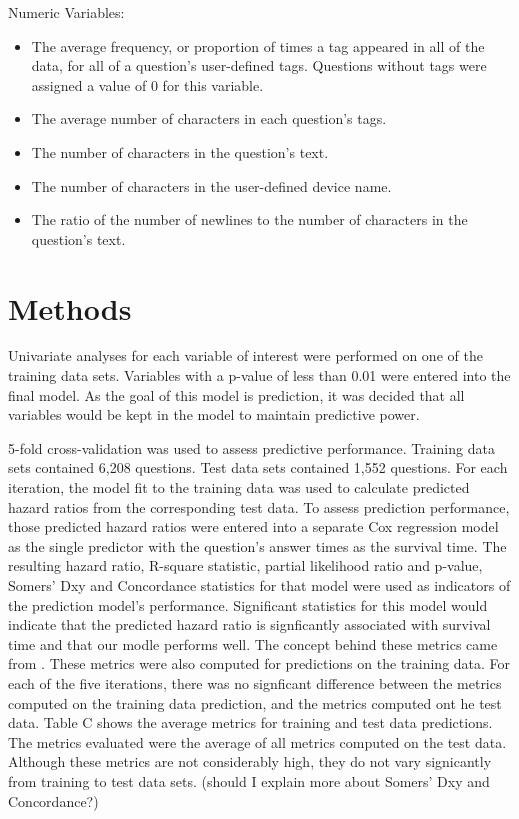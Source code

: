 \documentclass[12pt]{article}
\begin{document}
Numeric Variables:

\begin{itemize}
  \item The average frequency, or proportion of times a tag appeared in all of the data, for all of a question's user-defined tags. Questions without tags were assigned a value of 0 for this variable. 
  \item The average number of characters in each question's tags. 
  \item The number of characters in the question's text. 
  \item The number of characters in the user-defined device name. 
  \item The ratio of the number of newlines to the number of characters in the question's text.
\end{itemize}

\section{Methods} 

Univariate analyses for each variable of interest were performed on one of the training data sets. Variables with a p-value of less than 0.01 were entered into the final model. As the goal of this model is prediction, it was decided that all variables would be kept in the model to maintain predictive power. 

5-fold cross-validation was used to assess predictive performance. Training data sets contained 6,208 questions. Test data sets contained 1,552 questions. For each iteration, the model fit to the training data was used to calculate predicted hazard ratios from the corresponding test data. To assess prediction performance, those predicted hazard ratios were entered into a separate Cox regression model as the single predictor with the question's answer times as the survival time. The resulting hazard ratio, R-square statistic, partial likelihood ratio and p-value, Somers' Dxy and Concordance statistics for that model were used as indicators of the prediction model's performance. Significant statistics for this model would indicate that the predicted hazard ratio is signficantly associated with survival time and that our modle performs well. The concept behind these metrics came from \cite{Chen}. These metrics were also computed for predictions on the training data. For each of the five iterations, there was no signficant difference between the metrics computed on the training data prediction, and the metrics computed ont he test data. Table C shows the average metrics for training and test data predictions. The metrics evaluated were the average of all metrics computed on the test data. Although these metrics are not considerably high, they do not vary signicantly from training to test data sets.  (should I explain more about Somers' Dxy and Concordance?) 
\end{document}
